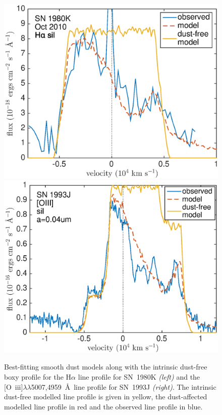 \begin{figure}
\centering
\includegraphics[clip=true,scale=0.42,trim= 20 0 50 0]{chapters/chapter6/figs/80K/smooth/Ha_with_dust_free}
\includegraphics[clip=true,scale=0.42,trim= 17 0 50 0]{chapters/chapter6/figs/93J/smooth/OIII_with_dust_free}
\caption{Best-fitting smooth dust models along with the intrinsic dust-free boxy profile for the H$\alpha$ line profile for SN~1980K {\em (left)} and the [O~{\sc iii}]$\lambda\lambda$5007,4959~\AA\ line profile for SN~1993J {\em (right)}.  The intrinsic dust-free modelled line profile is given in yellow, the dust-affected modelled line profile in red and the observed line profile in blue.}
\label{boxy}
\end{figure}

